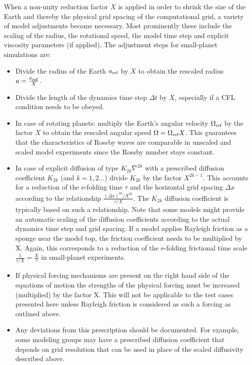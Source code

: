 \documentclass[times,doublespace]{fldauth}
\begin{document}
When a non-unity reduction factor $X$ is applied in order to shrink the size of the Earth and thereby the physical grid spacing of the computational grid, a variety of model adjustments become necessary.
Most prominently these include the scaling of the radius, the rotational speed, the model time step and explicit viscosity parameters (if applied). The adjustment steps for small-planet simulations are:
\begin{itemize}
\item Divide the radius of the Earth $a_{\tiny \mbox{ref}}$ by $X$ to obtain the rescaled radius $a  = \frac{a_{\tiny \mbox{ref}}}{X}$.
\item Divide the length of the dynamics time step $\Delta t$ by $X$, especially if a CFL condition needs to be obeyed.
\item In case of rotating planets: multiply the Earth's angular velocity $\Omega_{\tiny \mbox{ref}}$ by the factor $X$ to obtain the rescaled angular speed $\Omega = \Omega_{\tiny \mbox{ref}}X$. This guarantees that the characteristics of Rossby waves are comparable in unscaled and scaled model experiments since the Rossby number stays constant.
\item In case of explicit diffusion of type $K_{2k}\nabla^{2k}$ with a prescribed diffusion coefficient $K_{2k}$ (and $k=1,2\ldots$) divide $K_{2k}$ by the factor $X^{2k-1}$. This accounts for a reduction of the e-folding time $\tau$  and the horizontal grid spacing $\Delta x$ according to the relationship $\frac{(\Delta x)^{2k}/X^{2k}}{\tau/X}$. The $K_{2k}$ diffusion coefficient is typically based on such a relationship. Note that some models might provide an automatic scaling of the diffusion coefficients according to the actual dynamics time step and grid spacing. If a model applies Rayleigh friction as a sponge near the model top, the friction coefficient needs to be multiplied by X. Again, this corresponds to a reduction of the e-folding frictional time scale $\frac{1}{\tau/X} = \frac{X}{\tau}$ in small-planet experiments.
\item If physical forcing mechanisms are present on the right hand side of the equations of motion the strengths of the physical forcing must be increased (multiplied) by the factor X. This will not be applicable to the test cases presented here unless Rayleigh friction is considered as such a forcing as outlined above.
\item Any deviations from this prescription should be documented.  For example, some modeling groups may have a prescribed diffusion coefficient that depends on grid resolution that can be used in place of the scaled diffusivity described above.
\end{itemize}
\end{document}
